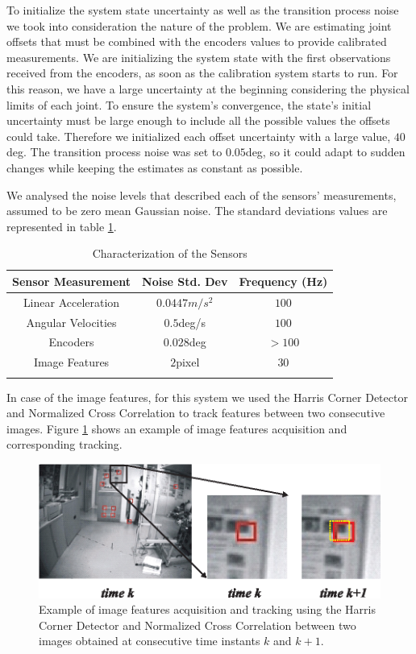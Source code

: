 To initialize the system state uncertainty as well as the transition process noise we took into consideration the nature of the problem. We are estimating joint offsets that must be combined with the encoders values to provide calibrated measurements. We are initializing the system state with the first observations received from the encoders, as soon as the calibration system starts to run. For this reason, we have a large uncertainty at the beginning considering the physical limits of each joint. To ensure the system's convergence, the state's initial uncertainty must be large enough to include all the possible values the offsets could take. Therefore we initialized each offset uncertainty with a large value, $40$deg. The transition process noise was set to $0.05$deg, so it could adapt to sudden changes while keeping the estimates as constant as possible.

We analysed the noise levels that described each of the sensors' measurements, assumed to be zero mean Gaussian noise. The standard deviations values are represented in table \ref{tab:sensors_noise}.

\begin{table}
\centering
\begin{tabular}{ccc}
 \hline
 Sensor Measurement & Noise Std. Dev & Frequency (Hz) \\
 \hline
 Linear Acceleration & $0.0447m/s^2$ & $100$\\
  Angular Velocities & $0.5$deg/s & $100$\\
  Encoders & $0.028$deg & $>100$\\
  Image Features & $2$pixel & $30$\\
 \hline\\
\end{tabular}
\caption{Characterization of the Sensors}
\label{tab:sensors_noise}
\end{table}

In case of the image features, for this system we used the Harris Corner Detector \cite{Harris88} and Normalized Cross Correlation \cite{Briechle01} to track features between two consecutive images. Figure \ref{fig:harris_corners_tracking} shows an example of image features acquisition and corresponding tracking.

\begin{figure}
\centering
\includegraphics[width=0.75\columnwidth]{images/harris_corners_tracking}
\caption{Example of image features acquisition and tracking using the Harris Corner Detector and Normalized Cross Correlation between two images obtained at consecutive time instants $k$ and $k+1$.}
\label{fig:harris_corners_tracking}
\end{figure}

